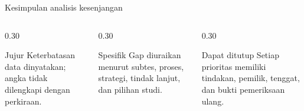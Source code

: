 \begin{frame}{Kesimpulan analisis kesenjangan}
  \begin{columns}[T,onlytextwidth]
    \begin{column}{0.30\textwidth}
      \begin{block}{Jujur}
        Keterbatasan data dinyatakan; angka tidak dilengkapi dengan perkiraan.
      \end{block}
    \end{column}
    \begin{column}{0.30\textwidth}
      \begin{block}{Spesifik}
        Gap diuraikan menurut subtes, proses, strategi, tindak lanjut, dan pilihan studi.
      \end{block}
    \end{column}
    \begin{column}{0.30\textwidth}
      \begin{block}{Dapat ditutup}
        Setiap prioritas memiliki tindakan, pemilik, tenggat, dan bukti pemeriksaan ulang.
      \end{block}
    \end{column}
  \end{columns}
  \vspace{0.27cm}
\end{frame}
